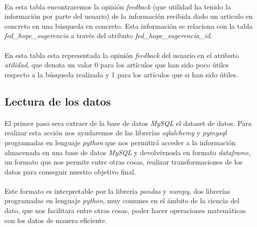\documentclass[10pt,a4paper,oneside]{book}
\begin{document}
\paragraph{}
En esta tabla encontraremos la opinión \textit{feedback} (que utilidad ha tenido la información por parte del usuario) de la información recibida dado un articulo en concreto en una búsqueda en concreto. Esta información se relaciona con la tabla \textit{fed\_hope\_sugerencia} a través del atributo \textit{fed\_hope\_sugerencia\_id}.

\paragraph{}
En esta tabla esta representada la opinión \textit{feedback} del usuario en el atributo \textit{utilidad}, que denota un valor 0 para los artículos que han sido poco útiles respecto a la búsqueda realizada y 1 para los artículos que si han sido útiles.

\newpage
\subsection{Lectura de los datos}

\paragraph{}
El primer paso sera extraer de la base de datos \textit{MySQL} el dataset de datos. Para realizar esta acción nos ayudaremos de las librerías \textit{sqlalchemy} y \textit{pymysql} programadas en lenguaje \textit{python} que nos permitirá acceder a la información almacenada en una base de datos \textit{MySQL} y devolvérnosla en formato \textit{dataframe}, un formato que nos permite entre otras cosas, realizar transformaciones de los datos para conseguir nuestro objetivo final.

\paragraph{}
Este formato es interpretable por la librería \textit{pandas} y \textit{numpy}, dos librerías programadas en lenguaje \textit{python}, muy comunes en el ámbito de la ciencia del dato, que nos facilitara entre otras cosas, poder hacer operaciones matemáticas con los datos de manera eficiente.
\end{document}
